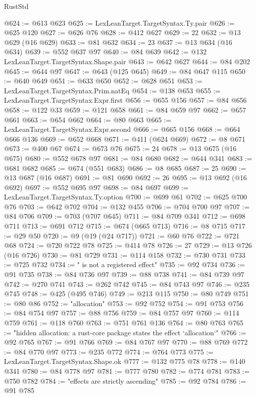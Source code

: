 \begin{lexlean}{RustStd}
\begin{coremodule}
{\begin{coremodule}
{{{{{{{{{{{{{{{{{{{{{{{{{{{{{{{{{{{{{{{{{{{{{{{{{{{{{{@624 := @613 @623
@625 := LexLeanTarget.TargetSyntax.Ty.pair
@626 := @625 @120
@627 := @626 @76
@628 := @412 @627
@629 := 22
@632 := @13 @629 (@16 @629)
@633 := @81 @632
@634 := 23
@637 := @13 @634 (@16 @634)
@639 := @552 @637 @97
@640 := @84 @639
@642 := @132 LexLeanTarget.TargetSyntax.Shape.pair
@643 := @642 @627
@644 := @84 @202
@645 := @644 @97
@647 := @643 (@125 @645)
@649 := @84 @647 @115
@650 := @640 @649
@651 := @633 @650
@652 := @628 @651
@653 := LexLeanTarget.TargetSyntax.Prim.natEq
@654 := @138 @653
@655 := LexLeanTarget.TargetSyntax.Expr.first
@656 := @655 @156
@657 := @84 @656
@658 := @122 @33
@659 := @121 @658
@661 := @84 @659 @97
@662 := @657 @661
@663 := @654 @662
@664 := @80 @663
@665 := LexLeanTarget.TargetSyntax.Expr.second
@666 := @665 @156
@668 := @664 @666 @136
@669 := @652 @668
@671 := @411 (@624 @669)
@672 := @8 @671
@673 := @400 @67
@674 := @673 @76
@675 := 24
@678 := @13 @675 (@16 @675)
@680 := @552 @678 @97
@681 := @84 @680
@682 := @644 @341
@683 := @681 @682
@685 := @674 (@551 @683)
@686 := @8 @685
@687 := 25
@690 := @13 @687 (@16 @687)
@691 := @81 @690
@692 := 26
@695 := @13 @692 (@16 @692)
@697 := @552 @695 @97
@698 := @84 @697
@699 := LexLeanTarget.TargetSyntax.Ty.option
@700 := @699 @61
@702 := @625 @700 @76
@703 := @642 @702
@704 := @132 @455
@706 := @704 @700 @97
@707 := @84 @706
@709 := @703 (@707 @645)
@711 := @84 @709 @341
@712 := @698 @711
@713 := @691 @712
@715 := @674 (@665 @713)
@716 := @8 @715
@717 := @29 @50
@720 := @9 (@19 (@24 @717))
@721 := @60 @76
@722 := @721 @68
@724 := @720 @722 @78
@725 := @414 @78
@726 := 27
@729 := @13 @726 (@16 @726)
@730 := @81 @729
@731 := @114 @158
@732 := @730 @731
@733 := @725 @732
@734 := " is not a registered effect"
@735 := @92 @734
@736 := @91 @735
@738 := @84 @736 @97
@739 := @88 @738
@741 := @84 @739 @97
@742 := @270 @741
@743 := @262 @742
@745 := @84 @743 @97
@746 := @235 @745
@748 := @425 (@495 @746)
@749 := @213 @115
@750 := @80 @749
@751 := @80 @86
@752 := "allocation"
@753 := @92 @752
@754 := @91 @753
@756 := @84 @754 @97
@757 := @88 @756
@759 := @84 @757 @97
@760 := @114 @759
@761 := @118 @760
@763 := @751 @761 @136
@764 := @80 @763
@765 := "hidden allocation: a rust-core package states the effect `allocation`"
@766 := @92 @765
@767 := @91 @766
@769 := @84 @767 @97
@770 := @88 @769
@772 := @84 @770 @97
@773 := @235 @772
@774 := @764 @773
@775 := LexLeanTarget.TargetSyntax.Shape.ok
@777 := @132 @775 @78
@778 := @140 @341
@780 := @84 @778 @97
@781 := @777 @780
@782 := @774 @781
@783 := @750 @782
@784 := "effects are strictly ascending"
@785 := @92 @784
@786 := @91 @785
}}}}}}}}}}}}}}}}}}}}}}}}}}}}}}}}}}}}}}}}}}}}}}}}}}}}}}
\end{coremodule}}
\end{coremodule}
\end{lexlean}
